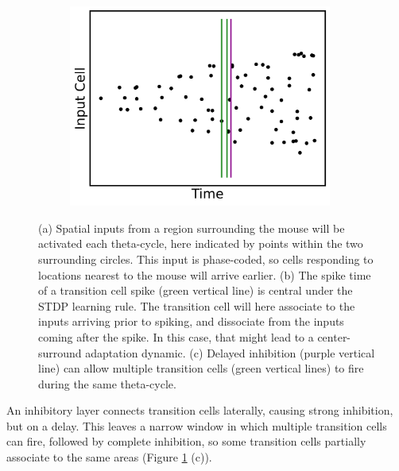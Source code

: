 \documentclass{article}
\begin{document}
\begin{figure}[htbp]
\begin{minipage}[b]{0.38\textwidth}
            \medskip
            
            \begin{subfigure}{\textwidth}
                \subcaption{}
                \includegraphics[width=0.95\textwidth]{input_inhibit_plot.png}
            \end{subfigure}
        \end{minipage}%
        
        \caption{(a) Spatial inputs from a region surrounding the mouse will be activated each theta-cycle, here indicated by points within the two surrounding circles. This input is phase-coded, so cells responding to locations nearest to the mouse will arrive earlier. (b) The spike time of a transition cell spike (green vertical line) is central under the STDP learning rule. The transition cell will here associate to the inputs arriving prior to spiking, and dissociate from the inputs coming after the spike. In this case, that might lead to a center- surround adaptation dynamic. (c) Delayed inhibition (purple vertical line) can allow multiple transition cells (green vertical lines) to fire during the same theta-cycle.}
        
        \label{mouse_plot}
    \end{figure}

    
    An inhibitory layer connects transition cells laterally, causing strong inhibition, but on a delay. This leaves a narrow window in which multiple transition cells can fire, followed by complete inhibition, so some transition cells partially associate to the same areas (Figure \ref{mouse_plot} (c)).
\end{document}
